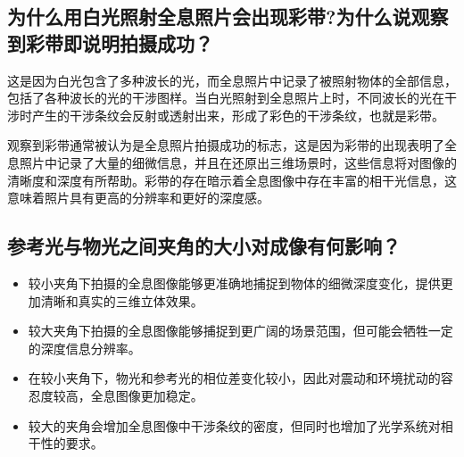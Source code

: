 \documentclass{ctexart}
\begin{document}
\subsection{为什么用白光照射全息照片会出现彩带?为什么说观察到彩带即说明拍摄成功？}
这是因为白光包含了多种波长的光，而全息照片中记录了被照射物体的全部信息，包括了各种波长的光的干涉图样。当白光照射到全息照片上时，不同波长的光在干涉时产生的干涉条纹会反射或透射出来，形成了彩色的干涉条纹，也就是彩带。

观察到彩带通常被认为是全息照片拍摄成功的标志，这是因为彩带的出现表明了全息照片中记录了大量的细微信息，并且在还原出三维场景时，这些信息将对图像的清晰度和深度有所帮助。彩带的存在暗示着全息图像中存在丰富的相干光信息，这意味着照片具有更高的分辨率和更好的深度感。
\subsection{参考光与物光之间夹角的大小对成像有何影响？}
\begin{itemize}
    \item 较小夹角下拍摄的全息图像能够更准确地捕捉到物体的细微深度变化，提供更加清晰和真实的三维立体效果。
    \item 较大夹角下拍摄的全息图像能够捕捉到更广阔的场景范围，但可能会牺牲一定的深度信息分辨率。
    \item 在较小夹角下，物光和参考光的相位差变化较小，因此对震动和环境扰动的容忍度较高，全息图像更加稳定。
    \item 较大的夹角会增加全息图像中干涉条纹的密度，但同时也增加了光学系统对相干性的要求。
\end{itemize}
\end{document}
